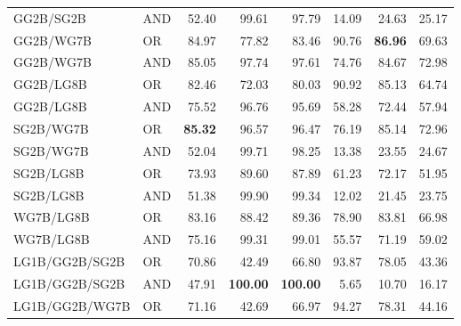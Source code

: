 \documentclass{article}
\begin{document}
{\begin{longtable}{llrrrrrr}
 GG2B/SG2B                & AND     & 52.40             & 99.61             & 97.79             & 14.09            & 24.63            & 25.17             \\
 GG2B/WG7B                & OR      & 84.97             & 77.82             & 83.46             & 90.76            & \textbf{86.96}   & 69.63             \\
 GG2B/WG7B                & AND     & 85.05             & 97.74             & 97.61             & 74.76            & 84.67            & 72.98             \\
 GG2B/LG8B                & OR      & 82.46             & 72.03             & 80.03             & 90.92            & 85.13            & 64.74             \\
 GG2B/LG8B                & AND     & 75.52             & 96.76             & 95.69             & 58.28            & 72.44            & 57.94             \\
 SG2B/WG7B                & OR      & \textbf{85.32}    & 96.57             & 96.47             & 76.19            & 85.14            & 72.96             \\
 SG2B/WG7B                & AND     & 52.04             & 99.71             & 98.25             & 13.38            & 23.55            & 24.67             \\
 SG2B/LG8B                & OR      & 73.93             & 89.60             & 87.89             & 61.23            & 72.17            & 51.95             \\
 SG2B/LG8B                & AND     & 51.38             & 99.90             & 99.34             & 12.02            & 21.45            & 23.75             \\
 WG7B/LG8B                & OR      & 83.16             & 88.42             & 89.36             & 78.90            & 83.81            & 66.98             \\
 WG7B/LG8B                & AND     & 75.16             & 99.31             & 99.01             & 55.57            & 71.19            & 59.02             \\
 LG1B/GG2B/SG2B           & OR      & 70.86             & 42.49             & 66.80             & 93.87            & 78.05            & 43.36             \\
 LG1B/GG2B/SG2B           & AND     & 47.91             & \textbf{100.00}   & \textbf{100.00}   & 5.65             & 10.70            & 16.17             \\
 LG1B/GG2B/WG7B           & OR      & 71.16             & 42.69             & 66.97             & 94.27            & 78.31            & 44.16             \\

\end{longtable}}
\end{document}
